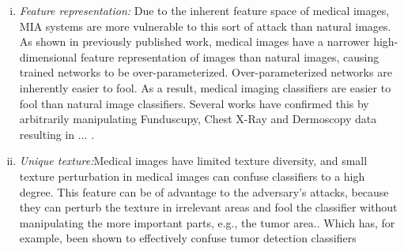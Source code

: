\begin{enumerate}[(i)]
    \item {\textit{Feature representation:}} Due to the inherent feature space of medical images, MIA systems are more vulnerable to this sort of attack than natural images. As shown in  previously published work, medical images have a narrower high-dimensional feature representation of images than natural images, causing trained networks to be over-parameterized. \cite{ma2021understanding} Over-parameterized networks are inherently easier to fool. \cite{Ye_2019_ICCV} As a result, medical imaging classifiers are easier to fool than natural image classifiers.  \cite{ma2021understanding} Several works have confirmed this by arbitrarily manipulating Funduscupy, Chest X-Ray and Dermoscopy data resulting in ... \cite{finlayson2019adversarial}. 
    \item \textit{Unique texture:}Medical images have limited texture diversity, and small texture perturbation in medical images can confuse classifiers to a high degree. \cite{ma2021understanding} This feature can be of advantage to the adversary's attacks, because they can perturb the texture in irrelevant areas and fool the classifier without manipulating the more important parts, e.g., the tumor area.\cite{ma2021understanding}. Which has, for example, been shown to effectively confuse tumor detection classifiers  \cite{gupta2022vulnerability}
    
\end{enumerate}



